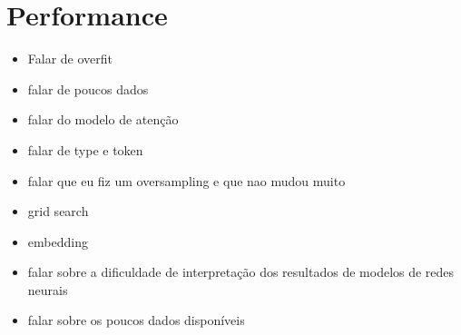 \section{Performance}

\begin{itemize}
    \item Falar de overfit
    \item falar de poucos dados
    \item falar do modelo de atenção
    \item falar de type e token
    \item falar que eu fiz um oversampling e que nao mudou muito
    \item grid search
    \item embedding
\end{itemize}

\begin{itemize}
   \item falar sobre a dificuldade de interpretação dos resultados de modelos de redes neurais
    \item falar sobre os poucos dados disponíveis%
    
\end{itemize}

